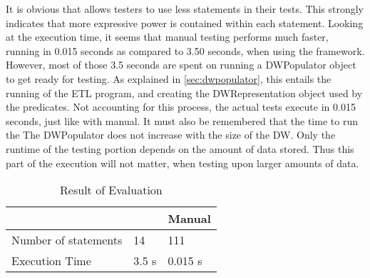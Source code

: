 It is obvious that \FW{} allows testers to use less statements in their tests. This strongly indicates that more expressive power is contained within each statement. Looking at the execution time, it seems that manual testing performs much faster, running in 0.015 seconds as compared to 3.50 seconds, when using the framework. However, most of those 3.5 seconds are spent on running a DWPopulator object to get ready for testing. As explained in \cref{sec:dwpopulator}, this entails the running of the ETL program, and creating the DWRepresentation object used by the predicates. Not accounting for this process, the actual tests execute in 0.015 seconds, just like with manual. It must also be remembered that the time to run the The DWPopulator does not increase with the size of the DW. Only the runtime of the  testing portion depends on the amount of data stored. Thus this part of the execution will not matter, when testing upon larger amounts of data.


\begin{table}[h]
\centering
\caption{Result of Evaluation}
\label{table:result}
\begin{tabular}{|p{}|p{}|p{}|}
\hline
												& \FW{}	 	& Manual				 \\ \hline

Number of statements  & 14 & 111 \\ \hline
Execution Time	& 3.5 s   & 0.015 s   \\ \hline
\end{tabular}
\end{table}







